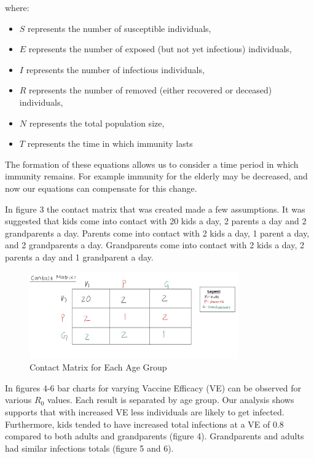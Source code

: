 \documentclass{report}
\begin{document}
where:
\begin{itemize}
  \item \(S\) represents the number of susceptible individuals,
  \item \(E\) represents the number of exposed (but not yet infectious) individuals,
  \item \(I\) represents the number of infectious individuals,
  \item \(R\) represents the number of removed (either recovered or deceased) individuals,
  \item \(N\) represents the total population size,
  \item \(T\) represents the time in which immunity lasts
\end{itemize}

The formation of these equations allows us to consider a time period in which immunity remains. For example immunity for the elderly may be decreased, and now our equations can compensate for this change. 

In figure 3 the contact matrix that was created made a few assumptions. It was suggested that kids come into contact with 20 kids a day, 2 parents a day and 2 grandparents a day. Parents come into contact with 2 kids a day, 1 parent a day, and 2 grandparents a day. Grandparents come into contact with 2 kids a day, 2 parents a day and 1 grandparent a day. 

\begin{figure}[H]
    \centering
    \includegraphics[width=0.8\textwidth]{Contact_Matrix.png}
    \caption{Contact Matrix for Each Age Group}
    \label{fig:Contact Matrix}
\end{figure}
In figures 4-6 bar charts for varying Vaccine Efficacy (VE) can be observed for various \(R_{0}\) values. Each result is separated by age group. Our analysis shows supports that with increased VE less individuals are likely to get infected. Furthermore, kids tended to have increased total infections at a VE of 0.8 compared to both adults and grandparents (figure 4). Grandparents and adults had similar infections totals (figure 5 and 6).
\end{document}
